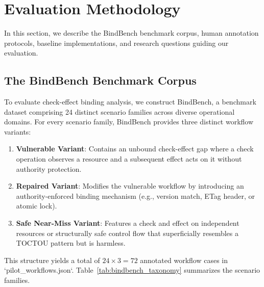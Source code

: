\section{Evaluation Methodology}
\label{sec:methodology}

In this section, we describe the \textsf{BindBench} benchmark corpus, human annotation protocols, baseline implementations, and research questions guiding our evaluation.

\subsection{The \textsf{BindBench} Benchmark Corpus}
To evaluate check-effect binding analysis, we construct \textsf{BindBench}, a benchmark dataset comprising 24 distinct scenario families across diverse operational domains. For every scenario family, \textsf{BindBench} provides three distinct workflow variants:
\begin{enumerate}
    \item \textbf{Vulnerable Variant}: Contains an unbound check-effect gap where a check operation observes a resource and a subsequent effect acts on it without authority protection.
    \item \textbf{Repaired Variant}: Modifies the vulnerable workflow by introducing an authority-enforced binding mechanism (e.g., version match, ETag header, or atomic lock).
    \item \textbf{Safe Near-Miss Variant}: Features a check and effect on independent resources or structurally safe control flow that superficially resembles a TOCTOU pattern but is harmless.
\end{enumerate}

This structure yields a total of $24 \times 3 = 72$ annotated workflow cases in `pilot_workflows.json`. Table~\ref{tab:bindbench_taxonomy} summarizes the scenario families.

